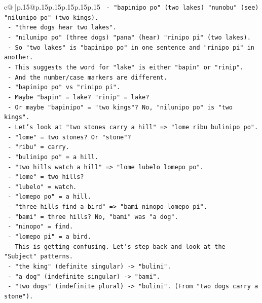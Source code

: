 \documentclass{article}
\begin{document}
{\begin{supertabular}{c@{$\;$}|p{.15\linewidth}@{}p{.15\linewidth}p{.15\linewidth}p{.15\linewidth}p{.15\linewidth}p{.15\linewidth}}
{{{\texttt{         {-} "bapinipo po" (two lakes) "nunobu" (see) "nilunipo po" (two kings).} \\
\texttt{       {-} "three dogs hear two lakes".} \\
\texttt{         {-} "nilunipo po" (three dogs) "pana" (hear) "rinipo pi" (two lakes).} \\
\texttt{       {-} So "two lakes" is "bapinipo po" in one sentence and "rinipo pi" in another.} \\
\texttt{       {-} This suggests the word for "lake" is either "bapin" or "rinip".} \\
\texttt{       {-} And the number/case markers are different.} \\
\texttt{       {-} "bapinipo po" vs "rinipo pi".} \\
\texttt{       {-} Maybe "bapin" = lake? "rinip" = lake?} \\
\texttt{       {-} Or maybe "bapinipo" = "two kings"? No, "nilunipo po" is "two kings".} \\
\texttt{       {-} Let's look at "two stones carry a hill" => "lome ribu bulinipo po".} \\
\texttt{         {-} "lome" = two stones? Or "stone"?} \\
\texttt{         {-} "ribu" = carry.} \\
\texttt{         {-} "bulinipo po" = a hill.} \\
\texttt{       {-} "two hills watch a hill" => "lome lubelo lomepo po".} \\
\texttt{         {-} "lome" = two hills?} \\
\texttt{         {-} "lubelo" = watch.} \\
\texttt{         {-} "lomepo po" = a hill.} \\
\texttt{       {-} "three hills find a bird" => "bami ninopo lomepo pi".} \\
\texttt{         {-} "bami" = three hills? No, "bami" was "a dog".} \\
\texttt{         {-} "ninopo" = find.} \\
\texttt{         {-} "lomepo pi" = a bird.} \\
\texttt{       {-} This is getting confusing. Let's step back and look at the "Subject" patterns.} \\
\texttt{       {-} "the king" (definite singular) {-}> "bulini".} \\
\texttt{       {-} "a dog" (indefinite singular) {-}> "bami".} \\
\texttt{       {-} "two dogs" (indefinite plural) {-}> "bulini". (From "two dogs carry a stone").} \\
}}}
\end{supertabular}}
\end{document}
